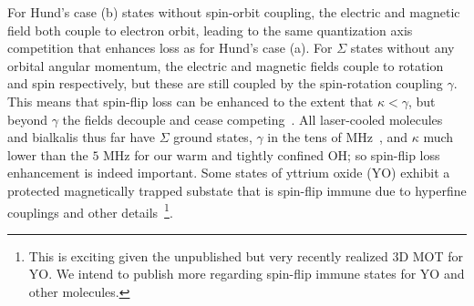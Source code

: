 \documentclass[%
 reprint,
 amsmath,amssymb,
 aps,
prl,
]{revtex4-1}
\begin{document}

%

For Hund's case (b) states without spin-orbit coupling, the electric and magnetic field both couple to electron orbit, leading to the same quantization axis competition that enhances loss as for Hund's case (a). For $\Sigma$ states without any orbital angular momentum, the electric and magnetic fields couple to rotation and spin respectively, but these are still coupled by the spin-rotation coupling $\gamma$. This means that spin-flip loss can be enhanced to the extent that $\kappa<\gamma$, but beyond $\gamma$ the fields decouple and cease competing~\cite{Bohn2013}. All laser-cooled molecules and bialkalis thus far have $\Sigma$ ground states, $\gamma$ in the tens of MHz~\cite{Quemener2016}, and $\kappa$ much lower than the $5\text{ MHz}$ for our warm and tightly confined OH; so spin-flip loss enhancement is indeed important. Some states of yttrium oxide (YO) exhibit a protected magnetically trapped substate that is spin-flip immune due to hyperfine couplings and other details~\footnote{This is exciting given the unpublished but very recently realized 3D MOT for YO. We intend to publish more regarding spin-flip immune states for YO and other molecules.}. %


\end{document}
